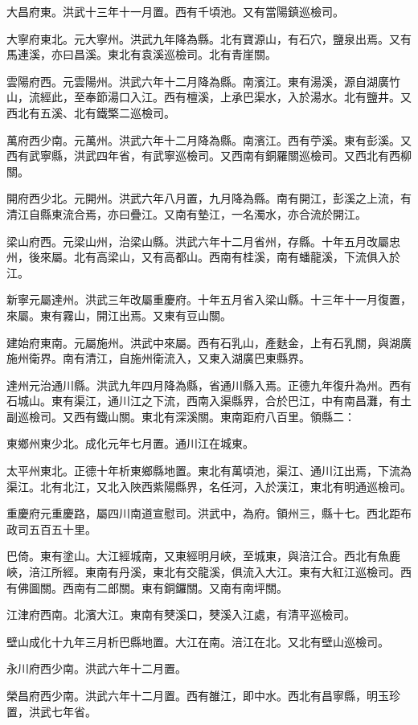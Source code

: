 大昌府東。洪武十三年十一月置。西有千頃池。又有當陽鎮巡檢司。

大寧府東北。元大寧州。洪武九年降為縣。北有寶源山，有石穴，鹽泉出焉。又有馬連溪，亦曰昌溪。東北有袁溪巡檢司。北有青崖關。

雲陽府西。元雲陽州。洪武六年十二月降為縣。南濱江。東有湯溪，源自湖廣竹山，流經此，至奉節湯口入江。西有檀溪，上承巴渠水，入於湯水。北有鹽井。又西北有五溪、北有鐵檠二巡檢司。

萬府西少南。元萬州。洪武六年十二月降為縣。南濱江。西有苧溪。東有彭溪。又西有武寧縣，洪武四年省，有武寧巡檢司。又西南有銅羅關巡檢司。又西北有西柳關。

開府西少北。元開州。洪武六年八月置，九月降為縣。南有開江，彭溪之上流，有清江自縣東流合焉，亦曰疊江。又南有墊江，一名濁水，亦合流於開江。

梁山府西。元梁山州，治梁山縣。洪武六年十二月省州，存縣。十年五月改屬忠州，後來屬。北有高梁山，又有高都山。西南有桂溪，南有蟠龍溪，下流俱入於江。

新寧元屬達州。洪武三年改屬重慶府。十年五月省入梁山縣。十三年十一月復置，來屬。東有霧山，開江出焉。又東有豆山關。

建始府東南。元屬施州。洪武中來屬。西有石乳山，產麩金，上有石乳關，與湖廣施州衛界。南有清江，自施州衛流入，又東入湖廣巴東縣界。

達州元治通川縣。洪武九年四月降為縣，省通川縣入焉。正德九年復升為州。西有石城山。東有渠江，通川江之下流，西南入渠縣界，合於巴江，中有南昌灘，有土副巡檢司。又西有鐵山關。東北有深溪關。東南距府八百里。領縣二：

東鄉州東少北。成化元年七月置。通川江在城東。

太平州東北。正德十年析東鄉縣地置。東北有萬頃池，渠江、通川江出焉，下流為渠江。北有北江，又北入陜西紫陽縣界，名任河，入於漢江，東北有明通巡檢司。

重慶府元重慶路，屬四川南道宣慰司。洪武中，為府。領州三，縣十七。西北距布政司五百五十里。

巴倚。東有塗山。大江經城南，又東經明月峽，至城東，與涪江合。西北有魚鹿峽，涪江所經。東南有丹溪，東北有交龍溪，俱流入大江。東有大紅江巡檢司。西有佛圖關。西南有二郎關。東有銅鑼關。又南有南坪關。

江津府西南。北濱大江。東南有僰溪口，僰溪入江處，有清平巡檢司。

壁山成化十九年三月析巴縣地置。大江在南。涪江在北。又北有壁山巡檢司。

永川府西少南。洪武六年十二月置。

榮昌府西少南。洪武六年十二月置。西有雒江，即中水。西北有昌寧縣，明玉珍置，洪武七年省。

